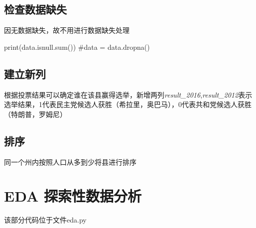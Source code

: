 \documentclass[
12pt, %
UTF8
]{fphw}
\begin{document}
	\subsection{检查数据缺失}
	因无数据缺失，故不用进行数据缺失处理\\
	\begin{python}
		print(data.isnull.sum())
		#data = data.dropna()
	\end{python}
	\subsection{建立新列}
	根据投票结果可以确定谁在该县赢得选举，新增两列\emph{result\_2016},\emph{result\_2012}表示选举结果，1代表民主党候选人获胜（希拉里，奥巴马），0代表共和党候选人获胜（特朗普，罗姆尼）
	\subsection{排序}
	同一个州内按照人口从多到少将县进行排序
	
	
\section{EDA 探索性数据分析}
	该部分代码位于文件eda.py
\end{document}
